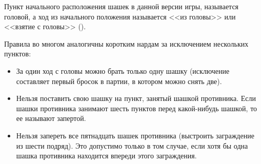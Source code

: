 Пункт начального расположения шашек в данной версии игры, называется головой, а ход из начального положения называется <<из головы>> или <<взятие с головы>> ().

Правила во многом аналогичны коротким нардам за исключением нескольких пунктов:

\begin{itemize}
    \item За один ход с головы можно брать только одну шашку (исключение составляет первый бросок в партии, в котором можно снять две).
    \item Нельзя поставить свою шашку на пункт, занятый шашкой противника. Если шашки противника занимают шесть пунктов перед какой-нибудь шашкой, то ее называют запертой.
    \item Нельзя запереть все пятнадцать шашек противника (выстроить заграждение из шести подряд). Это допустимо только в том случае, если хотя бы одна шашка противника находится впереди этого заграждения.
\end{itemize}

